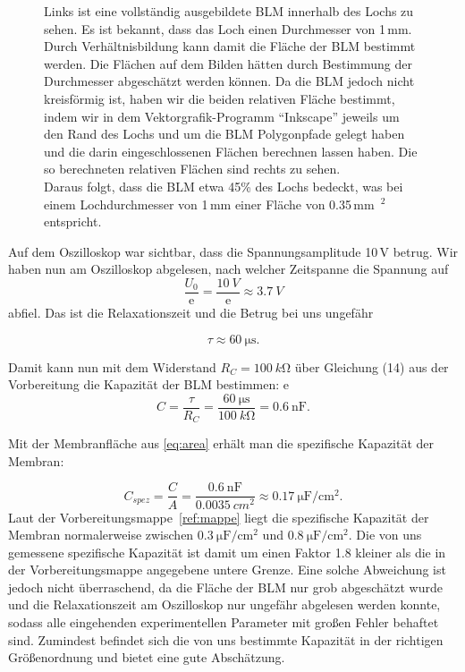 \documentclass[a4paper,ngerman]{scrartcl}
\begin{document}
\begin{figure}[tbh!]
\begin{minipage}[b]{.4\textwidth}
  \end{minipage}
  \caption{Links ist eine vollständig ausgebildete BLM innerhalb des Lochs zu sehen.
Es ist bekannt, dass das Loch einen Durchmesser von 1\,mm. Durch Verhältnisbildung kann damit die Fläche 
der BLM bestimmt werden. Die Flächen auf dem Bilden hätten durch Bestimmung der Durchmesser abgeschätzt werden können. Da die BLM jedoch
nicht kreisförmig ist, haben wir die beiden relativen Fläche bestimmt, indem wir in dem Vektorgrafik-Programm "`Inkscape"'
jeweils um den Rand des Lochs und um die BLM Polygonpfade gelegt haben und die darin eingeschlossenen Flächen berechnen lassen haben. Die so 
berechneten relativen Flächen sind rechts zu sehen.\\
Daraus folgt, dass die BLM etwa 45\% des Lochs bedeckt, was bei einem Lochdurchmesser von 1\,mm einer Fläche von 0.35\,mm~$^2$ entspricht.}
\label{fig:blmflaeche}
\end{figure}

Auf dem Oszilloskop war sichtbar, dass die Spannungsamplitude 10\,V betrug. Wir haben nun am Oszilloskop abgelesen, nach welcher Zeitspanne die Spannung auf
\begin{equation}
 \frac{U_0}{\mathrm{e}} = \frac{\SI{10}{V}}{\mathrm{e}} \approx \SI{3,7}{V} 
\end{equation}
abfiel. Das ist die Relaxationszeit und die Betrug bei uns ungefähr

\begin{equation}
  \label{eqn:tau_einkanal}
  \tau \approx \SI{60}{\micro\s}.
\end{equation}

Damit kann nun  mit dem Widerstand $R_C = \SI{100}{k\ohm}$
über Gleichung (14) aus der Vorbereitung die Kapazität der BLM bestimmen:
e\begin{equation}
 C = \frac{\tau}{R_C} = \frac{\SI{60}{\micro\s}}{\SI{100}{k\ohm}} = \SI{0,6}{\nano\farad}.
\end{equation}

Mit der Membranfläche aus \eqref{eq:area} erhält man die spezifische Kapazität der Membran:

\begin{equation}
  C_{spez} = \frac{C}{A} = \frac{\SI{0,6}{\nano\farad}}{\SI{0,0035}{cm^2}} \approx \SI{0,17}{\micro\farad\per\cm^2}.
\end{equation}
Laut der Vorbereitungsmappe~\ref{ref:mappe} liegt die spezifische Kapazität der Membran normalerweise zwischen $\SI{0,3}{\micro\F\per\cm^2}$
und $\SI{0,8}{\micro\F\per\cm^2}$. Die von uns gemessene spezifische Kapazität ist damit um einen Faktor 1.8 kleiner als die 
in der Vorbereitungsmappe angegebene untere Grenze. Eine solche Abweichung ist jedoch nicht überraschend, da 
die Fläche der BLM nur grob abgeschätzt wurde und die Relaxationszeit 
am Oszilloskop nur ungefähr abgelesen werden konnte, sodass alle eingehenden experimentellen Parameter mit großen Fehler behaftet sind.
Zumindest befindet sich die von uns bestimmte Kapazität in der richtigen Größenordnung und bietet eine gute Abschätzung. \\
\end{document}
